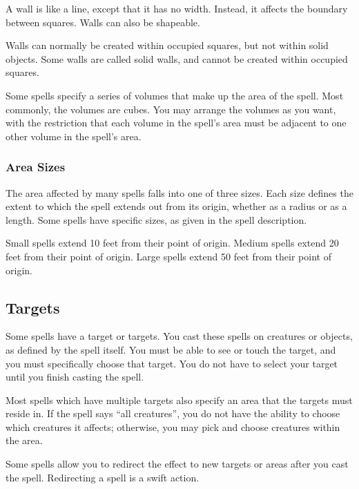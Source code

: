              A wall is like a line, except that it has no width. Instead, it affects the boundary between squares. Walls can also be shapeable.

            Walls can normally be created within occupied squares, but not within solid objects. Some walls are called solid walls, and cannot be created within occupied squares.

             Some spells specify a series of volumes that make up the area of the spell. Most commonly, the volumes are cubes. You may arrange the volumes as you want, with the restriction that each volume in the spell's area must be adjacent to one other volume in the spell's area.

        \subsubsection{Area Sizes}

            The area affected by many spells falls into one of three sizes. Each size defines the extent to which the spell extends out from its origin, whether as a radius or as a length. Some spells have specific sizes, as given in the spell description.

             Small spells extend 10 feet from their point of origin.
             Medium spells extend 20 feet from their point of origin.
             Large spells extend 50 feet from their point of origin.

    \subsection{Targets}
        Some spells have a target or targets. You cast these spells on creatures or objects, as defined by the spell itself. You must be able to see or touch the target, and you must specifically choose that target. You do not have to select your target until you finish casting the spell.

         Most spells which have multiple targets also specify an area that the targets must reside in. If the spell says ``all creatures'', you do not have the ability to choose which creatures it affects; otherwise, you may pick and choose creatures within the area.

         Some spells allow you to redirect the effect to new targets or areas after you cast the spell. Redirecting a spell is a swift action.


